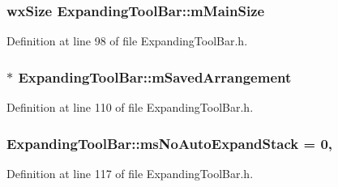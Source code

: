 \subsubsection[{\texorpdfstring{m\+Main\+Size}{mMainSize}}]{\setlength{\rightskip}{0pt plus 5cm}wx\+Size Expanding\+Tool\+Bar\+::m\+Main\+Size\hspace{0.3cm}{\ttfamily [protected]}}\hypertarget{class_expanding_tool_bar_a1738e0c37ba427d1bada3307ecc346a4}{}\label{class_expanding_tool_bar_a1738e0c37ba427d1bada3307ecc346a4}


Definition at line 98 of file Expanding\+Tool\+Bar.\+h.

\subsubsection[{\texorpdfstring{m\+Saved\+Arrangement}{mSavedArrangement}}]{$\ast$ Expanding\+Tool\+Bar\+::m\+Saved\+Arrangement\hspace{0.3cm}{\ttfamily [protected]}}\hypertarget{class_expanding_tool_bar_a5da27df2d33806b1c504715770386e0d}{}\label{class_expanding_tool_bar_a5da27df2d33806b1c504715770386e0d}


Definition at line 110 of file Expanding\+Tool\+Bar.\+h.

\subsubsection[{\texorpdfstring{ms\+No\+Auto\+Expand\+Stack}{msNoAutoExpandStack}}]{ Expanding\+Tool\+Bar\+::ms\+No\+Auto\+Expand\+Stack = 0\hspace{0.3cm}{\ttfamily [static]}, {\ttfamily [protected]}}\hypertarget{class_expanding_tool_bar_a5e0fb0df1fd56086a170d4eb1d0f4c30}{}\label{class_expanding_tool_bar_a5e0fb0df1fd56086a170d4eb1d0f4c30}


Definition at line 117 of file Expanding\+Tool\+Bar.\+h.


